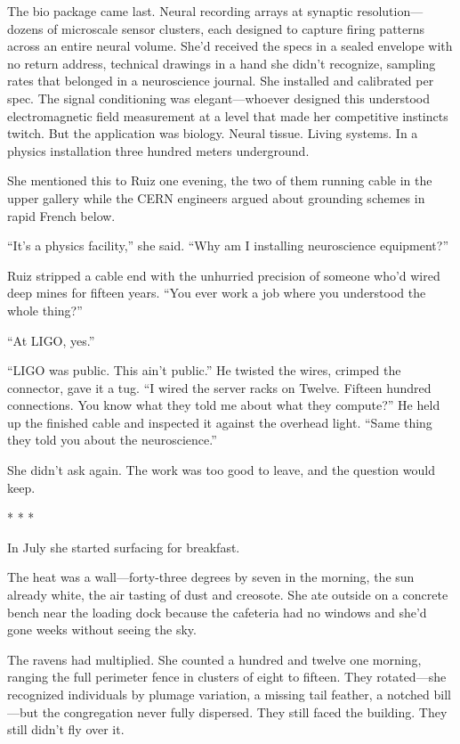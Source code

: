 \documentclass[12pt]{article}
\newcommand{\scenebreak}{\begin{center}* * *\end{center}}
\begin{document}
The bio package came last. Neural recording arrays at synaptic resolution---dozens of microscale sensor clusters, each designed to capture firing patterns across an entire neural volume. She'd received the specs in a sealed envelope with no return address, technical drawings in a hand she didn't recognize, sampling rates that belonged in a neuroscience journal. She installed and calibrated per spec. The signal conditioning was elegant---whoever designed this understood electromagnetic field measurement at a level that made her competitive instincts twitch. But the application was biology. Neural tissue. Living systems. In a physics installation three hundred meters underground.

She mentioned this to Ruiz one evening, the two of them running cable in the upper gallery while the CERN engineers argued about grounding schemes in rapid French below.

``It's a physics facility,'' she said. ``Why am I installing neuroscience equipment?''

Ruiz stripped a cable end with the unhurried precision of someone who'd wired deep mines for fifteen years. ``You ever work a job where you understood the whole thing?''

``At LIGO, yes.''

``LIGO was public. This ain't public.'' He twisted the wires, crimped the connector, gave it a tug. ``I wired the server racks on Twelve. Fifteen hundred connections. You know what they told me about what they compute?'' He held up the finished cable and inspected it against the overhead light. ``Same thing they told you about the neuroscience.''

She didn't ask again. The work was too good to leave, and the question would keep.

\scenebreak

In July she started surfacing for breakfast.

The heat was a wall---forty-three degrees by seven in the morning, the sun already white, the air tasting of dust and creosote. She ate outside on a concrete bench near the loading dock because the cafeteria had no windows and she'd gone weeks without seeing the sky.

The ravens had multiplied. She counted a hundred and twelve one morning, ranging the full perimeter fence in clusters of eight to fifteen. They rotated---she recognized individuals by plumage variation, a missing tail feather, a notched bill---but the congregation never fully dispersed. They still faced the building. They still didn't fly over it.
\end{document}
